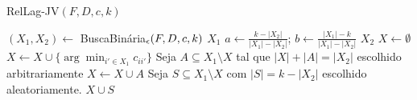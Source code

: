 \begin{algorithm}
    \caption{\sc RelLag-JV$(F,D,c,k)$}
    \begin{algorithmic}[1]
        \State $(X_1,X_2) \gets$ {\sc BuscaBinária}$_\epsilon(F,D,c,k)$
        \State \Return $X_1$
        \EndIf
        \State $a \gets \frac{k-|X_2|}{|X_1| - |X_2|}$; $b \gets \frac{|X_1| - k}{|X_1| - |X_2|}$
        \State \Return $X_2$
        \EndIf
        \State $X \gets \emptyset$
        \State $X \gets X \cup \{\arg\min_{i' \in X_1} c_{ii'}\}$
        \EndFor
        \State Seja $ A \subseteq X_1\setminus X$ tal que $|X| + |A| = |X_2|$ escolhido arbitrariamente
        \State $X \gets X \cup A$
        \EndIf
        \State Seja $S \subseteq X_1 \setminus X$ com $|S| = k - |X_2|$ escolhido aleatoriamente.
        \State \Return $X \cup S$
    \end{algorithmic}
\end{algorithm}

